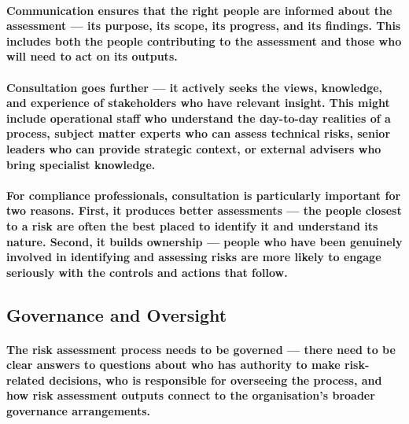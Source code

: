 \paragraph{\textbf{Communication} ensures that the right people are informed about the assessment — its purpose, its scope, its progress, and its findings. This includes both the people contributing to the assessment and those who will need to act on its outputs.}
\paragraph{\textbf{Consultation} goes further — it actively seeks the views, knowledge, and experience of stakeholders who have relevant insight. This might include operational staff who understand the day-to-day realities of a process, subject matter experts who can assess technical risks, senior leaders who can provide strategic context, or external advisers who bring specialist knowledge.}
\paragraph{For compliance professionals, consultation is particularly important for two reasons. First, it produces better assessments — the people closest to a risk are often the best placed to identify it and understand its nature. Second, it builds ownership — people who have been genuinely involved in identifying and assessing risks are more likely to engage seriously with the controls and actions that follow.}

\subsection{Governance and Oversight}
\paragraph{The risk assessment process needs to be governed — there need to be clear answers to questions about who has authority to make risk-related decisions, who is responsible for overseeing the process, and how risk assessment outputs connect to the organisation's broader governance arrangements.}
